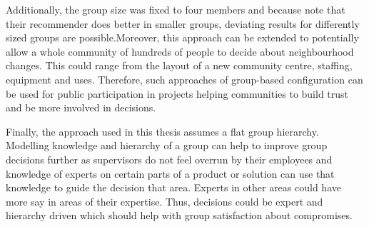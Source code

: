 Additionally, the group size was fixed to four members and because \citeauthor{choudharyMulticriteriaGroupRecommender2020} note that their recommender does better in smaller groups, deviating results for differently sized groups are possible.Moreover, this approach can be extended to potentially allow a whole community of hundreds of people to decide about neighbourhood changes. This could range from the layout of a new community centre, staffing, equipment and uses. Therefore, such approaches of group-based configuration can be used for public participation in projects helping communities to build trust and be more involved in decisions.

Finally, the approach used in this thesis assumes a flat group hierarchy. Modelling knowledge and hierarchy of a group can help to improve group decisions further as supervisors do not feel overrun by their employees and knowledge of experts on certain parts of a product or solution can use that knowledge to guide the decision that area. Experts in other areas could have more say in areas of their expertise. Thus, decisions could be expert and hierarchy driven which should help with group satisfaction about compromises.